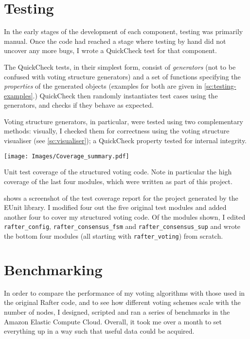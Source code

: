 \documentclass[12pt,chapterprefix=true,toc=bibliography,numbers=noendperiod,
               footnotes=multiple,twoside]{scrreprt}
\begin{document}
\section{Testing}

In the early stages of the development of each component, testing was primarily manual. Once the code had reached a stage where testing by hand did not uncover any more bugs, I wrote a QuickCheck test for that component.

The QuickCheck tests, in their simplest form, consist of \emph{generators} (not to be confused with voting structure generators) and a set of functions specifying the \emph{properties} of the generated objects (examples for both are given in \cref{sc:testing-examples}.) QuickCheck then randomly instantiates test cases using the generators, and checks if they behave as expected.

Voting structure generators, in particular, were tested using two complementary methods: visually, I checked them for correctness using the voting structure visualiser (see \cref{sc:visualiser}); a QuickCheck property tested for internal integrity.

\begin{table}[h]
    \centering
    \texttt{[image: Images/Coverage\_summary.pdf]}
    \caption[Unit test coverage]{Unit test coverage of the structured voting code. Note in particular the high coverage of the last four modules, which were written as part of this project.}
    \label{tab:coverage}
\end{table}

 shows a screenshot of the test coverage report for the project generated by the EUnit library. I modified four out the five original test modules and added another four to cover my structured voting code. Of the modules shown, I edited \texttt{rafter\_config}, \texttt{rafter\_consensus\_fsm} and \texttt{rafter\_consensus\_sup} and wrote the bottom four modules (all starting with \texttt{rafter\_voting}) from scratch.

\section{Benchmarking}

In order to compare the performance of my voting algorithms with those used in the original Rafter code, and to see how different voting schemes scale with the number of nodes, I designed, scripted and ran a series of benchmarks in the Amazon Elastic Compute Cloud. Overall, it took me over a month to set everything up in a way such that useful data could be acquired.
\end{document}
